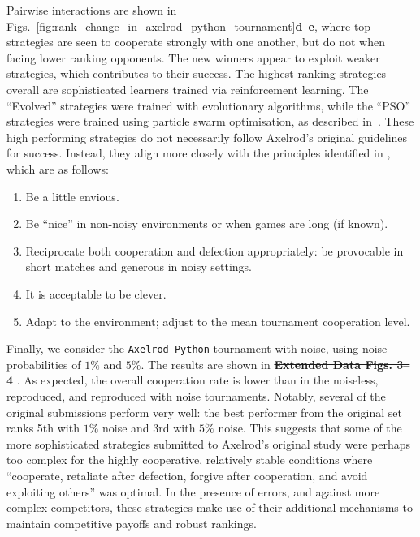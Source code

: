 \documentclass{article}
\newcommand{\AXL}{\texttt{Axelrod-Python}}
\providecommand{\DIFaddtex}[1]{{\protect\color{blue}\uwave{#1}}} %
\providecommand{\DIFdeltex}[1]{{\protect\color{red}\sout{#1}}}                      %
\providecommand{\DIFaddbegin}{} %
\providecommand{\DIFaddend}{} %
\providecommand{\DIFdelbegin}{} %
\providecommand{\DIFdelend}{} %
\providecommand{\DIFadd}[1]{\texorpdfstring{\DIFaddtex{#1}}{#1}} %
\providecommand{\DIFdel}[1]{\texorpdfstring{\DIFdeltex{#1}}{}} %
\newcommand{\DIFscaledelfig}{0.5}
\newlength{\DIFdelgraphicswidth} %
\newlength{\DIFdelgraphicsheight} %
\newcommand{\DIFaddincludegraphics}[2][]{{\color{blue}\fbox{\DIFOincludegraphics[#1]{#2}}}} %
\newcommand{\DIFdelincludegraphics}[2][]{%
\sbox{\DIFdelgraphicsbox}{\DIFOincludegraphics[#1]{#2}}%
\settoboxwidth{\DIFdelgraphicswidth}{\DIFdelgraphicsbox} %
\settoboxtotalheight{\DIFdelgraphicsheight}{\DIFdelgraphicsbox} %
\scalebox{\DIFscaledelfig}{%
\parbox[b]{\DIFdelgraphicswidth}{\usebox{\DIFdelgraphicsbox}\\[-\baselineskip] \rule{\DIFdelgraphicswidth}{0em}}\llap{\resizebox{\DIFdelgraphicswidth}{\DIFdelgraphicsheight}{%
\setlength{\unitlength}{\DIFdelgraphicswidth}%
\begin{picture}(1,1)%
\thicklines\linethickness{2pt} %
{\color[rgb]{1,0,0}\put(0,0){\framebox(1,1){}}}%
{\color[rgb]{1,0,0}\put(0,0){\line( 1,1){1}}}%
{\color[rgb]{1,0,0}\put(0,1){\line(1,-1){1}}}%
\end{picture}%
}\hspace*{3pt}}} %
} %
\DeclareRobustCommand{\DIFaddbegin}{\DIFOaddbegin \let\includegraphics\DIFaddincludegraphics} %
\DeclareRobustCommand{\DIFaddend}{\DIFOaddend \let\includegraphics\DIFOincludegraphics} %
\DeclareRobustCommand{\DIFdelbegin}{\DIFOdelbegin \let\includegraphics\DIFdelincludegraphics} %
\DeclareRobustCommand{\DIFdelend}{\DIFOaddend \let\includegraphics\DIFOincludegraphics} %
\begin{document}
Pairwise interactions are shown in
Figs.~\ref{fig:rank_change_in_axelrod_python_tournament}\textbf{d}--\textbf{e},
where top strategies are seen to cooperate strongly with one another, but do not
when facing lower ranking opponents. The new winners appear to exploit weaker
strategies, which contributes to their success.
The highest ranking strategies overall are sophisticated learners trained via
reinforcement learning. The ``Evolved'' strategies were trained with evolutionary
algorithms, while the ``PSO'' strategies were trained using particle swarm
optimisation, as described in~\cite{Harper2017}. These high performing
strategies do not necessarily follow Axelrod's original guidelines for success.
Instead, they align more closely with the principles identified in
\cite{glynatsi2024properties}, which are as follows:

\begin{enumerate}
    \item Be a little envious.
    \item Be ``nice'' in non-noisy environments or when games are long (if
    known).
    \item Reciprocate both cooperation and defection appropriately: be
    provocable in short matches and generous in noisy settings.
    \item It is acceptable to be clever.
    \item Adapt to the environment; adjust to the mean tournament cooperation
    level.
\end{enumerate}

Finally, we consider the \AXL{} tournament with noise, using noise probabilities
of \(1\%\) and \(5\%\). The results are shown in
\DIFdelbegin \textbf{\DIFdel{Extended Data Figs. 3--4}}%
\DIFdel{. }\DIFdelend \DIFaddbegin \DIFadd{Supplementary Figures~3 and~4. }\DIFaddend As expected, the
overall cooperation rate is lower than in the noiseless, reproduced, and
reproduced with noise tournaments. Notably, several of the original submissions
perform very well: the best performer from the original set ranks 5th with
\(1\%\) noise and 3rd with \(5\%\) noise. This suggests that some of the more
sophisticated strategies submitted to Axelrod's original study were perhaps too
complex for the highly cooperative, relatively stable conditions where
``cooperate, retaliate after defection, forgive after cooperation, and avoid
exploiting others'' was optimal. In the presence of errors, and against
more complex competitors, these strategies make use of their additional
mechanisms to maintain competitive payoffs and robust rankings.
\end{document}
